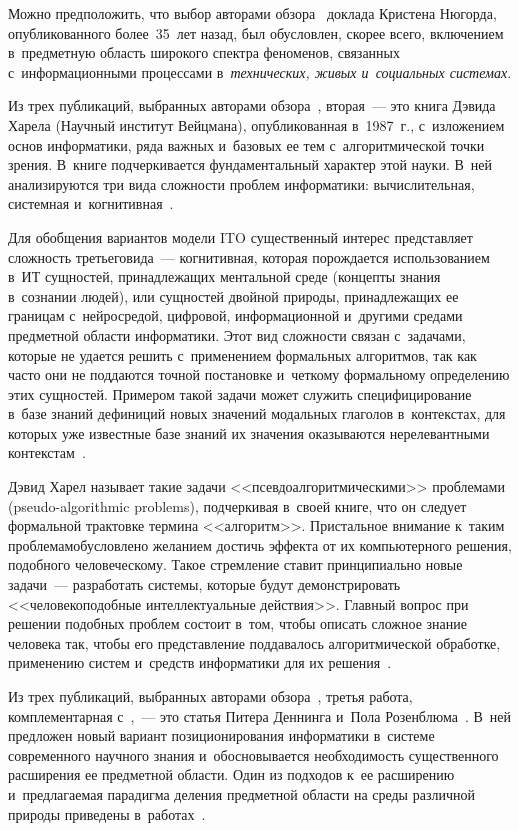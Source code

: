 \begin{multicols}{2}
  Можно предположить, что выбор авторами обзора~\cite{4-zac} доклада 
Кристена Нюгорда, опубликованного более~35~лет назад, был обуслов\-лен, 
скорее всего, включением в~предметную область широкого спектра 
феноменов, связанных с~информационными процессами 
в~\textit{технических, живых и~социальных системах}.
  
  Из трех публикаций, выбранных авторами обзора~\cite{4-zac}, вторая~--- 
это книга Дэвида Харела (Научный институт Вейцмана), опубликованная 
в~1987~г., с~изложением основ информатики, ряда важных и~базовых ее тем 
с~алгоритмической точки зрения. В~книге подчеркивается фундаментальный 
характер этой науки. В~ней анализируются три вида сложности проб\-лем 
информатики: вычислительная, системная и~когнитивная~\cite{9-zac}.
  
  Для обобщения вариантов модели ITO существенный интерес 
представляет сложность третьего\linebreak вида~--- когнитивная, которая порождается 
использованием в~ИТ сущностей, принадлежащих ментальной среде 
(концепты знания в~сознании людей), или сущностей двойной природы, 
\mbox{принадлежащих} ее границам с~нейросредой, циф\-ро\-вой, информационной 
и~другими средами предметной области информатики. Этот вид слож\-ности 
связан с~задачами, которые не удается решить с~применением формальных 
алгоритмов, так как час\-то они не поддаются точной постановке и~четкому 
формальному определению этих сущностей. Примером такой задачи может 
служить специфицирование в~базе знаний дефиниций новых значений 
модальных глаголов в~контекстах, для которых уже известные базе знаний их 
значения оказываются нерелевантными контекстам~\cite{14-zac}.
  
  Дэвид Харел называет такие задачи <<псевдоалгоритмическими>> 
проблемами (pseudo-algorithmic problems), подчеркивая в~своей книге, что он 
следует формальной трактовке термина <<алгоритм>>. Пристальное 
внимание к~таким проблемам\linebreak обуслов\-ле\-но желанием достичь эффекта от их 
компьютерного решения, подобного человеческому. Такое стремление ставит 
принципиально новые задачи~--- разработать системы, которые будут 
демонстрировать <<человекоподобные интеллектуальные действия>>. 
Главный вопрос при решении подобных проб\-лем состоит в~том, чтобы 
описать сложное знание человека так, чтобы его пред\-став\-ле\-ние поддавалось 
алгоритмической обработке, применению сис\-тем и~средств информатики для 
их решения~\cite[с.~402]{9-zac}.
  
  Из трех публикаций, выбранных авторами обзора~\cite{4-zac}, третья 
работа, комплементарная с~\cite{8-zac, 9-zac},~--- это статья Питера 
Деннинга и~Пола Розенблюма~\cite{10-zac}. В~ней предложен новый 
вариант позиционирования информатики в~системе современного научного 
знания и~обосновывается необходимость существенного расширения ее 
предметной области. Один из подходов к~ее расширению и~предлагаемая 
парадигма деления предметной области на среды различной природы 
приведены в~работах~\cite{3-zac, 15-zac, 16-zac, 17-zac}.
  

\end{multicols}
